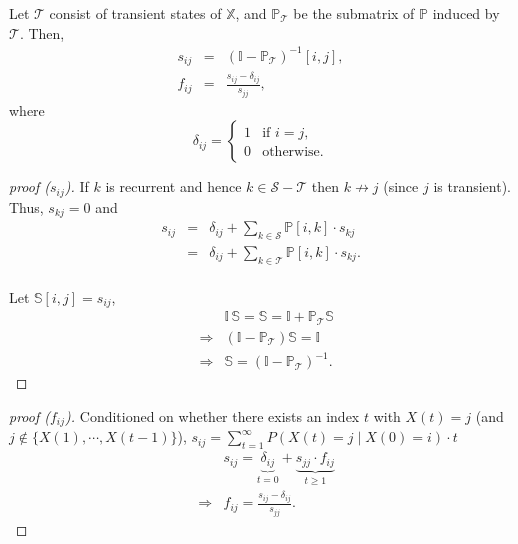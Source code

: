 \begin{theorem}
Let $ \mathcal{T} $ consist of transient states of $ \mathbb{X} $, and $ \mathbb{P}_{\mathcal{T}} $ be the submatrix of $ \mathbb{P} $ induced by $ \mathcal{T} $. Then,
\begin{eqnarray*}
s_{ij} & = & (\mathbb{I} - \mathbb{P}_{\mathcal{T}})^{-1}[i, j], \\
f_{ij} & = & \frac{s_{ij} - \delta_{ij}}{s_{jj}},
\end{eqnarray*}
where
\[ \delta_{ij} = \begin{cases}
  1 & \text{if } i = j, \\
  0 & \text{otherwise}.
\end{cases} \]

\begin{proof}[proof ($ s_{ij} $)]
If $ k $ is recurrent and hence $ k \in \mathcal{S} - \mathcal{T} $ then $ k \not\to j $ (since $ j $ is transient). Thus, $ s_{kj} = 0 $ and
\begin{eqnarray*}
s_{ij}
  & = & \delta_{ij} + \sum_{k \in \mathcal{S}} \mathbb{P}[i, k] \cdot s_{kj} \\
  & = & \delta_{ij} + \sum_{k \in \mathcal{T}} \mathbb{P}[i, k] \cdot s_{kj}. \\
\end{eqnarray*}

Let $ \mathbb{S}[i, j] = s_{ij} $,
\begin{eqnarray*}
  & & \mathbb{I}\,\mathbb{S} = \mathbb{S} = \mathbb{I} + \mathbb{P}_{\mathcal{T}} \mathbb{S} \\
  & \Rightarrow & (\mathbb{I} - \mathbb{P}_{\mathcal{T}})\mathbb{S} = \mathbb{I} \\
  & \Rightarrow & \mathbb{S} = (\mathbb{I} - \mathbb{P}_{\mathcal{T}})^{-1}.
\end{eqnarray*}
\end{proof}

\begin{proof}[proof ($ f_{ij} $)]
Conditioned on whether there exists an index $ t $ with $ X(t) = j $ (and $ j \not\in \{ X(1), \cdots, X(t - 1) \} $),
$ s_{ij} = \sum_{t = 1}^{\infty} P(X(t) = j \mid X(0) = i) \cdot t $
\begin{eqnarray*}
  & & s_{ij} = \underbrace{\delta_{ij}}_{t = 0}  + \underbrace{s_{jj} \cdot f_{ij}}_{t \ge 1} \\
  & \Rightarrow & f_{ij} = \frac{s_{ij} - \delta_{ij}}{s_{jj}}.
\end{eqnarray*}
\end{proof}
\end{theorem}

